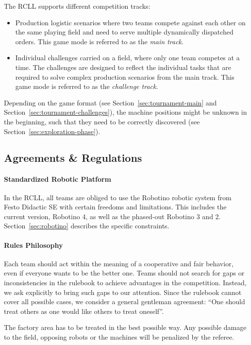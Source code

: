 \documentclass[12pt,twoside]{article}
\newcommand{\refsec}[1]{Section~\ref{#1}}
\begin{document}
The RCLL supports different competition tracks:
\begin{itemize}\itemsep 0em
  \item Production logistic scenarios where two teams compete against
    each other on the same playing field and need to serve multiple dynamically
    dispatched orders. This game mode is referred to as the \emph{main track}.
  \item Individual challenges carried on a field, where only one team competes
   at a time.
   The challenges are designed to reflect the individual tasks that
   are required to solve complex production scenarios from the main track.
   This game mode is referred to as the \emph{challenge track}.
\end{itemize}
Depending on the game format
(see \refsec{sec:tournament-main} and \refsec{sec:tournament-challenges}),
the machine positions might be unknown in the beginning, such that they need
to be correctly discovered (see \refsec{sec:exploration-phase}).


\subsection{Agreements \& Regulations}
\label{sec:agreements}
\paragraph{Standardized Robotic Platform}
In the RCLL, all teams are obliged to use the Robotino robotic system
from Festo Didactic SE with certain freedoms and limitations. This
includes the current version, Robotino 4, as well as the phased-out
Robotino 3 and 2. \refsec{sec:robotino} describes the specific constraints.

\paragraph{Rules Philosophy}
Each team should act within the meaning of a cooperative and fair behavior,
even if everyone wants to be the better one.
Teams should not search for gaps or inconsistencies in the rulebook to achieve
advantages in the competition. Instead, we ask explicitly to bring such gaps
to our attention. Since the rulebook cannot cover all possible cases, we
consider a general gentleman agreement:
``One should treat others as one would like others to treat oneself''.

The factory area has to be treated in the best possible way.
Any possible damage to the field, opposing robots or the machines will be
penalized by the referee.
\end{document}
